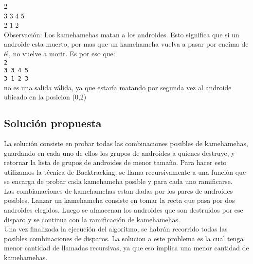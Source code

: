         2 \\
        3 3 4 5 \\
        2 1 2 \\

        Observación: Los kamehamehas matan a los androides. Esto significa que si un androide esta muerto, por mas que un kamehameha vuelva a pasar por encima de él, no vuelve a morir. Es por eso que: \\

        \texttt{2} \\
        \texttt{3 3 4 5} \\
        \texttt{3 1 2 3} \\

        no es una salida válida, ya que estaría matando por segunda vez al androide ubicado en la posicion (0,2) \\
        

    \subsection{Solución propuesta}

    La solución consiste en probar todas las combinaciones posibles de kamehamehas, guardando en cada uno de ellos los grupos de androides a quienes destruye, y retornar la lista de grupos de androides de menor tamaño. Para hacer esto utilizamos la técnica de Backtracking; se llama recursivamente a una función que se encarga de probar cada kamehameha posible y para cada uno ramificarse. \\

    Las combianaciones de kamehamehas estan dadas por los pares de androides posibles. Lanzar un kamehameha consiste en tomar la recta que pasa por dos androides elegidos. Luego se almacenan los androides que son destruidos por ese disparo y se continua con la ramificación de kamehamehas. \\

    Una vez finalizada la ejecución del algoritmo, se habrán recorrido todas las posibles combinaciones de disparos. La solucion a este problema es la cual tenga menor cantidad de llamadas recursivas, ya que eso implica una menor cantidad de kamehamehas. \\

